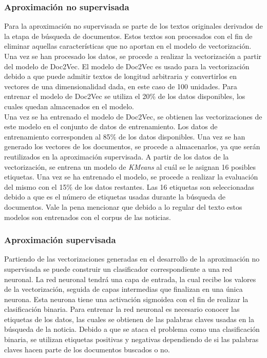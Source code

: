 \subsubsection{Aproximación no supervisada}
Para la aproximación no supervisada se parte de los textos originales derivados de la etapa de búsqueda de documentos. Estos textos son procesados con el fin de eliminar aquellas características que no aportan en el modelo de vectorización. Una vez se han procesado los datos, se procede a realizar la vectorización a partir del modelo de Doc2Vec. El modelo de Doc2Vec es usado para la vectorización debido a que puede admitir textos de longitud arbitraria y convertirlos en vectores de una dimensionalidad dada, en este caso de 100 unidades. Para entrenar el modelo de Doc2Vec se utiliza el 20\% de los datos disponibles, los cuales quedan almacenados en el modelo. \\

Una vez se ha entrenado el modelo de Doc2Vec, se obtienen las vectorizaciones de este modelo en el conjunto de datos de entrenamiento. Los datos de entrenamiento corresponden al 85\% de los datos disponibles. Una vez se han generado los vectores de los documentos, se procede a almacenarlos, ya que serán reutilizados en la aproximación supervisada. A partir de los datos de la vectorización, se entrena un modelo de \textit{KMeans} al cuál se le asignan 16 posibles etiquetas. Una vez se ha entrenado el modelo, se procede a realizar la evaluación del mismo con el 15\% de los datos restantes. Las 16 etiquetas son seleccionadas debido a que es el número de etiquetas usadas durante la búsqueda de documentos. Vale la pena mencionar que debido a lo regular del texto estos modelos son entrenados con el corpus de las noticias. 

\subsubsection{Aproximación supervisada}
Partiendo de las vectorizaciones generadas en el desarrollo de la aproximación no supervisada se puede construir un clasificador correspondiente a una red neuronal. La red neuronal tendrá una capa de entrada, la cual recibe los valores de la vectorización, seguida de capas intermedias que finalizan en una única neurona. Esta neurona tiene una activación sigmoidea con el fin de realizar la clasificación binaria. Para entrenar la red neuronal es necesario conocer las etiquetas de los datos, las cuales se obtienen de las palabras claves usadas en la búsqueda de la noticia. Debido a que se ataca el problema como una clasificación binaria, se utilizan etiquetas positivas y negativas dependiendo de si las palabras claves hacen parte de los documentos buscados o no. 

